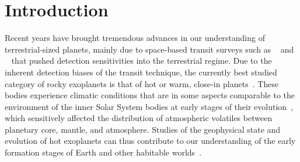 \documentclass[twocolumn,twocolappendix]{aastex631}
\begin{document}
\section{Introduction}


Recent years have brought tremendous advances in our understanding of terrestrial-sized planets, mainly due to space-based transit surveys such as \kepler\ \citep{Borucki2010} and \tess\ \citep{Ricker2014a} that pushed detection sensitivities into the terrestrial regime.
Due to the inherent detection biases of the transit technique, the currently best studied category of rocky exoplanets is that of hot or warm, close-in planets~\citep{2019AREPS..47..141J,2021JGRE..12606639B}.
These bodies experience climatic conditions that are in some aspects comparable to the environment of the inner Solar System bodies at early stages of their evolution~\citep{Ikoma2018,2021ChEG...81l5735C}, which sensitively affected the distribution of atmospheric volatiles between planetary core, mantle, and atmosphere.
Studies of the geophysical state and evolution of hot exoplanets can thus contribute to our understanding of the early formation stages of Earth and other habitable worlds~\citep{2022arXiv220310023L,Krijt2022}.
\end{document}
